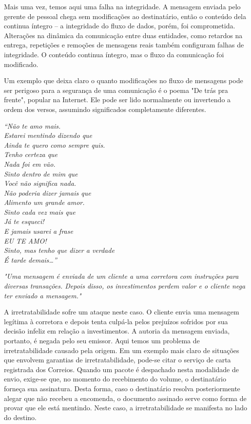 \documentclass[
	10pt,				%
	openright,			%
	twoside,			%
	a5paper,			%
	english,			%
	french,				%
	spanish,			%
	brazil,				%
	sumario=tradicional
]{abntex2}
\begin{document}
Mais uma vez, temos aqui uma falha na integridade. A mensagem enviada pelo gerente de pessoal chega sem modificações ao destinatário, então o conteúdo dela continua íntegro -- a integridade do fluxo de dados, porém, foi comprometida. Alterações na dinâmica da comunicação entre duas entidades, como retardos na entrega, repetições e remoções de mensagens reais também configuram falhas de integridade. O conteúdo continua íntegro, mas o fluxo da comunicação foi modificado.

Um exemplo que deixa claro o quanto modificações no fluxo de mensagens pode ser perigoso para a segurança de uma comunicação é o poema "De trás pra frente", popular na Internet. Ele pode ser lido normalmente ou invertendo a ordem dos versos, assumindo significados completamente diferentes.

\begin{center}
\textit{“Não te amo mais.\\
Estarei mentindo dizendo que \\
Ainda te quero como sempre quis.\\
Tenho certeza que\\
Nada foi em vão.\\
Sinto dentro de mim que\\
Você não significa nada.\\
Não poderia dizer jamais que\\
Alimento um grande amor.\\
Sinto cada vez mais que\\
Já te esqueci!\\
E jamais usarei a frase\\
EU TE AMO!\\
Sinto, mas tenho que dizer a verdade\\
É tarde demais…”}
\end{center}

\textit{"Uma mensagem é enviada de um cliente a uma corretora com instruções para diversas transações. Depois disso, os investimentos perdem valor e o cliente nega ter enviado a mensagem."}

A irretratabilidade sofre um ataque neste caso. O cliente envia uma mensagem legítima à corretora e depois tenta culpá-la pelos prejuízos sofridos por sua decisão infeliz em relação a investimentos. A autoria da mensagem enviada, portanto, é negada pelo seu emissor. Aqui temos um problema de irretratabilidade causado pela origem. Em um exemplo mais claro de situações que envolvem garantias de irretratabilidade, pode-se citar o serviço de carta registrada dos Correios. Quando um pacote é despachado nesta modalidade de envio, exige-se que, no momento do recebimento do volume, o destinatário forneça sua assinatura. Desta forma, caso o destinatário resolva posteriormente alegar que não recebeu a encomenda, o documento assinado serve como forma de provar que ele está mentindo. Neste caso, a irretratabilidade se manifesta no lado do destino.
\end{document}
